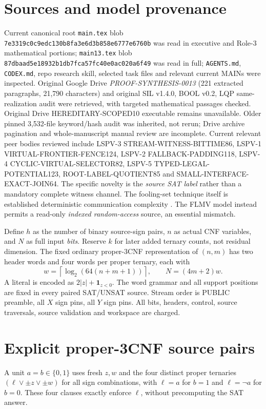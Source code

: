 \documentclass[11pt]{article}
\begin{document}
\section{Sources and model provenance}
Current canonical root \texttt{main.tex} blob \texttt{7e3319c0c9edc130b8fa3e6d3b858e6777e6760b} was read in executive and Role-3 mathematical portions; \texttt{main13.tex} blob \texttt{87dbaad5e18932b1db7fca57fc40e0ac020a6f49} was read in full; \texttt{AGENTS.md}, \texttt{CODEX.md}, repo research skill, selected task files and relevant current MAINs were inspected. Original Google Drive \emph{PROOF-SYNTHESIS-0013} (221 extracted paragraphs, 21,790 characters) and original SIL v1.4.0, BOOL v0.2, LQP same-realization audit were retrieved, with targeted mathematical passages checked. Original Drive HEREDITARY-SCOPED10 executable remains unavailable. Older pinned 3,532-file keyword/hash audit was inherited, not rerun; Drive archive pagination and whole-manuscript manual review are incomplete.
Current relevant peer bodies reviewed include LSPV-3 STREAM-WITNESS-BITTIME86, LSPV-1 VIRTUAL-FRONTIER-FENCE124, LSPV-2 FALLBACK-PADDING118, LSPV-4 CYCLIC-VIRTUAL-SELECTOR82, LSPV-5 TYPED-LEGAL-POTENTIAL123, ROOT-LABEL-QUOTIENT85 and SMALL-INTERFACE-EXACT-JOIN64. The specific novelty is the \emph{source SAT label} rather than a mandatory complete witness channel. The fooling-set technique itself is established deterministic communication complexity \cite{comm}. The FLMV model \cite{flmv} instead permits a read-only \emph{indexed random-access} source, an essential mismatch.

Define $h$ as the number of binary source-sign pairs, $n$ as actual CNF variables, and $N$ as full input \emph{bits}. Reserve $k$ for later added ternary counts, not residual dimension. The fixed ordinary proper-3CNF representation of $(n,m)$ has two header words and four words per proper ternary, each with
\[
 w=\left\lceil\log_2(64(n+m+1))\right\rceil,\qquad N=(4m+2)w.
\tag{1}
\]
A literal is encoded as $2|z|+\mathbf 1_{z<0}$. The word grammar and all support positions are fixed in every paired SAT/UNSAT source. Stream order is PUBLIC preamble, all $X$ sign pins, all $Y$ sign pins. All bits, headers, control, source traversals, source validation and workspace are charged.

\section{Explicit proper-3CNF source pairs}
A unit $a=b\in\{0,1\}$ uses fresh $z,w$ and the four distinct proper ternaries $(\ell\vee \pm z\vee\pm w)$ for all sign combinations, with $\ell=a$ for $b=1$ and $\ell=\neg a$ for $b=0$. These four clauses exactly enforce $\ell$, without precomputing the SAT answer.
\end{document}
